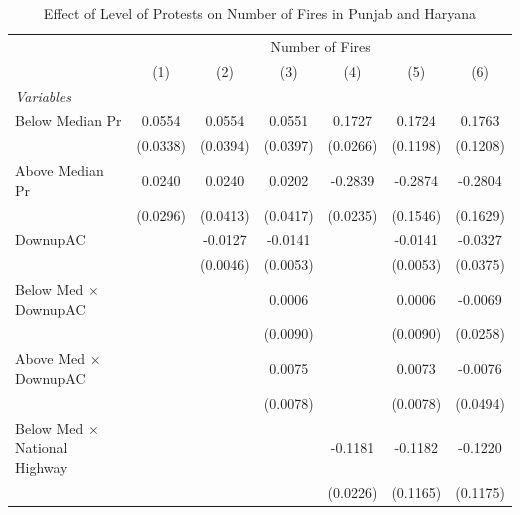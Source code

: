 
\begin{table}[htbp]
   \caption{\label{tab:protest_treat_main} Effect of Level of Protests on Number of Fires in Punjab and Haryana}
   \centering
   \begin{tabular}{lcccccc}
      \tabularnewline \midrule \midrule
       & \multicolumn{6}{c}{Number of Fires}\\
                                           & (1)           & (2)           & (3)           & (4)           & (5)           & (6)\\  
      \midrule
      \emph{Variables}\\
      Below Median Pr                      & 0.0554        & 0.0554        & 0.0551        & 0.1727        & 0.1724        & 0.1763\\   
                                           & (0.0338)      & (0.0394)      & (0.0397)      & (0.0266)      & (0.1198)      & (0.1208)\\   
      Above Median Pr                      & 0.0240        & 0.0240        & 0.0202        & -0.2839       & -0.2874       & -0.2804\\   
                                           & (0.0296)      & (0.0413)      & (0.0417)      & (0.0235)      & (0.1546)      & (0.1629)\\   
      DownupAC                             &               & -0.0127       & -0.0141       &               & -0.0141       & -0.0327\\   
                                           &               & (0.0046)      & (0.0053)      &               & (0.0053)      & (0.0375)\\   
      Below Med $\times$ DownupAC          &               &               & 0.0006        &               & 0.0006        & -0.0069\\   
                                           &               &               & (0.0090)      &               & (0.0090)      & (0.0258)\\   
      Above Med $\times$ DownupAC          &               &               & 0.0075        &               & 0.0073        & -0.0076\\   
                                           &               &               & (0.0078)      &               & (0.0078)      & (0.0494)\\   
      Below Med $\times$ National Highway  &               &               &               & -0.1181       & -0.1182       & -0.1220\\   
                                           &               &               &               & (0.0226)      & (0.1165)      & (0.1175)\\   

\end{tabular}
\end{table}
